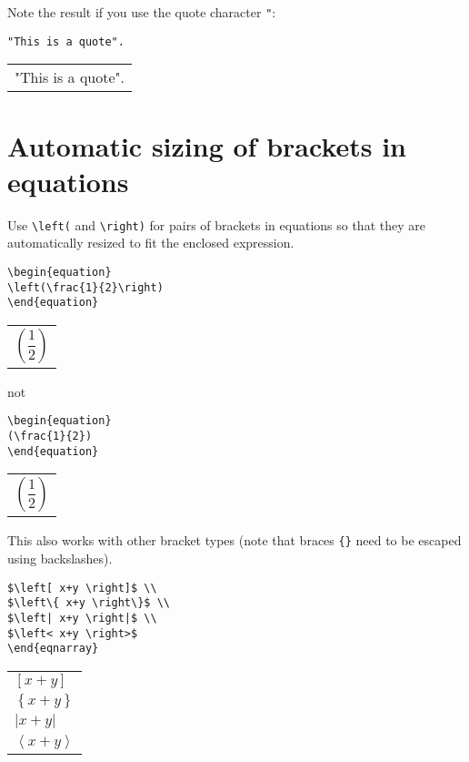 \documentclass[a4paper]{tufte-handout}
\begin{document}
Note the result if you use the quote character \lstinline{"}:
\begin{lstlisting}
"This is a quote".
\end{lstlisting}
\begin{tabular}{|p{10cm}}
"This is a quote".
\end{tabular}

\section{Automatic sizing of brackets in equations}
Use \lstinline{\left(} and \lstinline{\right)} for pairs of brackets in equations so that they are automatically resized to fit the enclosed expression.
\begin{lstlisting}
\begin{equation}
\left(\frac{1}{2}\right)
\end{equation}
\end{lstlisting}
\begin{tabular}{|p{10cm}}
\begin{equation*}
\left(\frac{1}{2}\right)
\end{equation*}
\end{tabular}

not 
\begin{lstlisting}
\begin{equation}
(\frac{1}{2})
\end{equation}
\end{lstlisting}
\begin{tabular}{|p{10cm}}
\begin{equation*}
(\frac{1}{2})
\end{equation*}
\end{tabular}

This also works with other bracket types (note that braces \lstinline${}$ need to be escaped using backslashes).

\begin{lstlisting}
$\left[ x+y \right]$ \\
$\left\{ x+y \right\}$ \\
$\left| x+y \right|$ \\
$\left< x+y \right>$
\end{eqnarray}
\end{lstlisting}
\begin{tabular}{|p{10cm}}
$\left[ x+y \right]$ \\
$\left\{ x+y \right\}$ \\
$\left| x+y \right|$ \\
$\left< x+y \right>$
\end{tabular}
\end{document}
